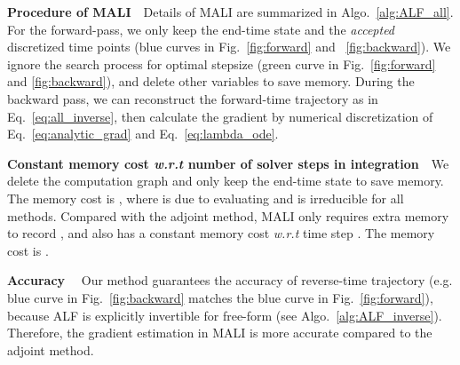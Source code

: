 \documentclass{article} \usepackage{iclr2021_conference,times}
\begin{document}
\textbf{Procedure of MALI}\ \ Details of MALI are summarized in Algo.~\ref{alg:ALF_all}. For the forward-pass, we only keep the end-time state  and the \textit{accepted} discretized time points (blue curves in Fig.~\ref{fig:forward} and ~\ref{fig:backward}). We ignore the search process for optimal stepsize (green curve in Fig.~\ref{fig:forward} and \ref{fig:backward}), and delete other variables to save memory. During the backward pass, we can reconstruct the forward-time trajectory as in Eq.~\ref{eq:all_inverse}, then calculate the gradient by numerical discretization of Eq.~\ref{eq:analytic_grad} and Eq.~\ref{eq:lambda_ode}. 


\textbf{Constant memory cost \textit{w.r.t} number of solver steps in integration}\ \ We delete the computation graph and only keep the end-time state to save memory. The memory cost is , where  is due to evaluating  and is irreducible for all methods. Compared with the adjoint method, MALI only requires extra  memory to record , and also has a constant memory cost \textit{w.r.t} time step . The memory cost is . 

\textbf{Accuracy} \ \ Our method guarantees the accuracy of reverse-time trajectory (e.g. blue curve in Fig.~\ref{fig:backward} matches the blue curve in Fig.~\ref{fig:forward}), because ALF is explicitly invertible for free-form  (see Algo.~\ref{alg:ALF_inverse}). Therefore, the gradient estimation in MALI is more accurate compared to the adjoint method.
\end{document}
